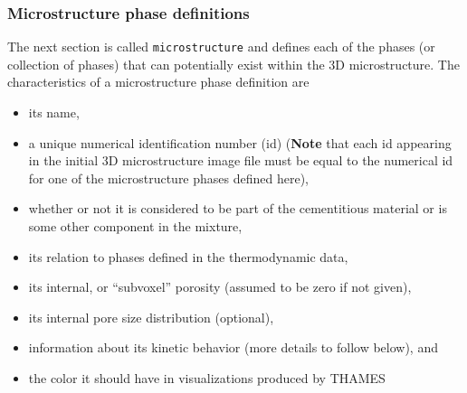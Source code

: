 \documentclass{article}
\begin{document}
\subsubsection{\label{sec:microphases} Microstructure phase definitions}
The next section is called \verb!microstructure! and defines each
of the phases (or collection of phases) that can potentially exist
within the 3D microstructure. The characteristics of a microstructure
phase definition are
\begin{itemize}
	\item its name,
	\item a unique numerical identification number (id) (\textbf{Note}
	      that each id appearing in the initial 3D microstructure image
	      file must be equal to the numerical id for one of the microstructure
	      phases defined here),
	\item whether or not it is considered to be part of the cementitious
	      material or is some other component in the mixture,
	\item its relation to phases defined in the thermodynamic data,
	\item its internal, or ``subvoxel'' porosity (assumed to be zero if
	      not given),
	\item its internal pore size distribution (optional),
	\item information about its kinetic behavior (more details to follow below),
	      and
	\item the color it should have in visualizations produced by THAMES
\end{itemize}
\end{document}
